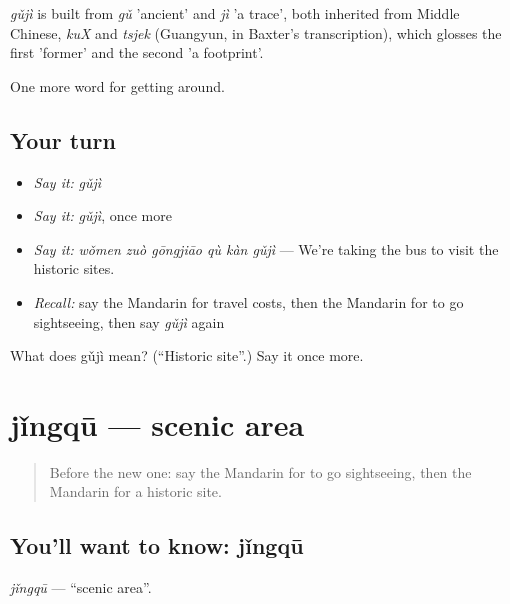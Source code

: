\begin{cousinweb}
\emph{gǔjì} is built from \emph{gǔ} 'ancient' and \emph{jì} 'a trace', both inherited from Middle Chinese, \emph{kuX} and \emph{tsjek} (Guangyun, in Baxter's transcription), which glosses the first 'former' and the second 'a footprint'.
\end{cousinweb}

\begin{grammarlens}[title={What you've built}]
One more word for getting around.
\end{grammarlens}

\subsection*{Your turn}
\begin{itemize}
\raggedright
  \item \emph{Say it:} \emph{gǔjì}
  \item \emph{Say it:} \emph{gǔjì}, once more
  \item \emph{Say it:} \emph{wǒmen zuò gōngjiāo qù kàn gǔjì} — We're taking the bus to visit the historic sites.
  \item \emph{Recall:} say the Mandarin for travel costs, then the Mandarin for to go sightseeing, then say \emph{gǔjì} again
\end{itemize}

\begin{tcolorbox}[breakable,colback=teal!4,colframe=teal!35!black,title={Before you move on}]
What does gǔjì mean? (\textquotedblleft{}Historic site\textquotedblright{}.) Say it once more.
\end{tcolorbox}
\section[jǐngqū]{jǐngqū — scenic area}

\label{lesson:ZH-C430-jingqu}



\begin{quote}
Before the new one: say the Mandarin for to go sightseeing, then the Mandarin for a historic site.
\end{quote}

\subsection*{You'll want to know: jǐngqū}
\emph{jǐngqū} — \textquotedblleft{}scenic area\textquotedblright{}.

